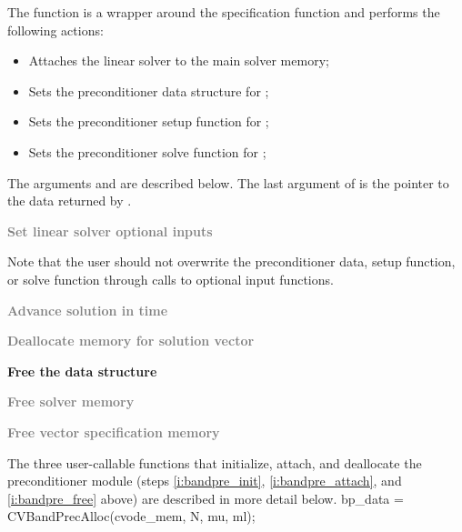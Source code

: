 \begin{Steps}
  The function  is a wrapper around the {\cvspgmr} specification
  function  and performs the following actions:
  \begin{itemize}
    \item Attaches the {\cvspgmr} linear solver to the main {\cvode} solver memory;
    \item Sets the preconditioner data structure for {\cvbandpre};
    \item Sets the preconditioner setup function for {\cvbandpre};
    \item Sets the preconditioner solve function for {\cvbandpre};
  \end{itemize}
  The arguments  and  are described below.
  The last argument of  is the pointer to the {\cvbandpre} data
  returned by .

\item
  \textcolor{gray}{\bf Set linear solver optional inputs}

  Note that the user should not overwrite the preconditioner data, setup function, 
  or solve function through calls to {\cvspgmr} optional input functions.

\item
  \textcolor{gray}{\bf Advance solution in time}

\item
  \textcolor{gray}{\bf Deallocate memory for solution vector}

\item \label{i:bandpre_free}
  {\bf Free the {\cvbandpre} data structure}


\item
  \textcolor{gray}{\bf Free solver memory}
  
\item
  \textcolor{gray}{\bf Free vector specification memory}

\end{Steps}
The three user-callable functions that initialize, attach, and deallocate
the {\cvbandpre} preconditioner module (steps \ref{i:bandpre_init},
\ref{i:bandpre_attach}, and \ref{i:bandpre_free} above) are described
in more detail below.
{
  bp\_data = CVBandPrecAlloc(cvode\_mem, N, mu, ml);
}
